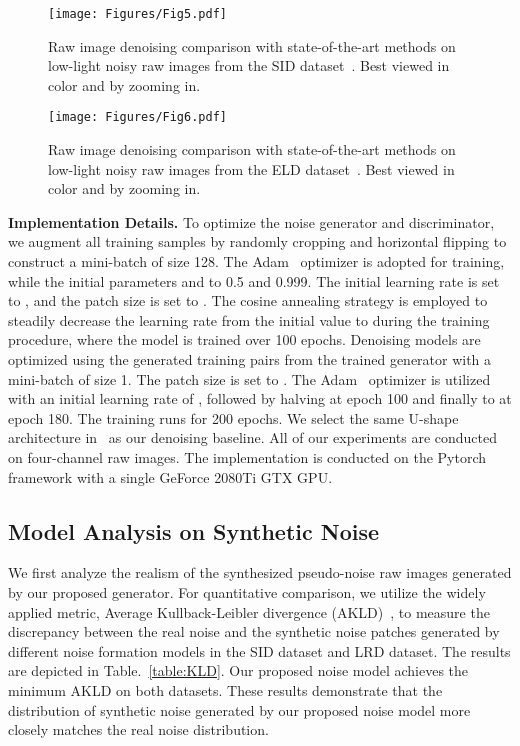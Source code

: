 \documentclass[10pt,twocolumn,letterpaper]{article}
\begin{document}
\begin{figure*}
\begin{center}
\texttt{[image: Figures/Fig5.pdf]}
\caption{Raw image denoising comparison with state-of-the-art methods on low-light noisy raw images from the SID dataset~\cite{chen2018learning}. Best viewed in color and by zooming in.}
\label{fig:SID}
\end{center}
\vspace{-3ex}
\end{figure*}

\begin{figure*}
\begin{center}
\texttt{[image: Figures/Fig6.pdf]}
\caption{Raw image denoising comparison with state-of-the-art methods on low-light noisy raw images from the ELD dataset~\cite{wei2020physics}. Best viewed in color
and by zooming in.}
\label{fig:ELD}
\end{center}
\vspace{-4ex}
\end{figure*}

\textbf{Implementation Details.} To optimize the noise generator and discriminator, we augment all training samples by randomly cropping and horizontal flipping to construct a mini-batch of size 128. The Adam~\cite{kingma2014adam} optimizer is adopted for training, while the initial parameters  and  to 0.5 and 0.999. The initial learning rate is set to , and the patch size is set to . The cosine annealing strategy is employed to steadily decrease the learning rate from the initial value to  during the training procedure, where the model is trained over 100 epochs. Denoising models are optimized using the generated training pairs from the trained generator with a mini-batch of size 1. The patch size is set to . The Adam~\cite{kingma2014adam} optimizer is utilized with an initial learning rate of , followed by halving at epoch 100 and finally to  at epoch 180. The training runs for 200 epochs. We select the same U-shape architecture in~\cite{chen2018learning} as our denoising baseline. All of our experiments are conducted on four-channel raw images. The implementation is conducted on the Pytorch framework with a single GeForce 2080Ti GTX GPU.

\vspace{-0.5em}
\subsection{Model Analysis on Synthetic Noise}
\vspace{-0.5em}
We first analyze the realism of the synthesized pseudo-noise raw images generated by our proposed generator. For quantitative comparison, we utilize the widely applied metric, Average Kullback-Leibler divergence (AKLD)~\cite{yue2020dual}, to measure the discrepancy between the real noise and the synthetic noise patches generated by different noise formation models in the SID dataset and LRD dataset. The results are depicted in Table.~\ref{table:KLD}. Our proposed noise model achieves the minimum AKLD on both datasets. These results demonstrate that the distribution of synthetic noise generated by our proposed noise model more closely matches the real noise distribution.
\end{document}
